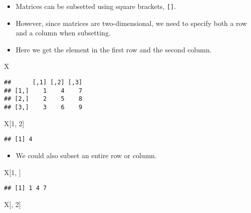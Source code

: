 \documentclass[]{book}
\newenvironment{Shaded}{\begin{snugshade}}{\end{snugshade}}
\newcommand{\DecValTok}[1]{\textcolor[rgb]{0.00,0.00,0.81}{#1}}
\newcommand{\NormalTok}[1]{#1}
\providecommand{\tightlist}{%
  \setlength{\itemsep}{0pt}\setlength{\parskip}{0pt}}
\begin{document}
\begin{itemize}
\tightlist
\item
  Matrices can be subsetted using square brackets, \texttt{{[}{]}}.
\item
  However, since matrices are two-dimensional, we need to specify both a row and a column when subsetting.
\item
  Here we get the element in the first row and the second column.
\end{itemize}

\begin{Shaded}
\begin{Highlighting}[]
\NormalTok{X}
\end{Highlighting}
\end{Shaded}

\begin{verbatim}
##      [,1] [,2] [,3]
## [1,]    1    4    7
## [2,]    2    5    8
## [3,]    3    6    9
\end{verbatim}

\begin{Shaded}
\begin{Highlighting}[]
\NormalTok{X[}\DecValTok{1}\NormalTok{, }\DecValTok{2}\NormalTok{]}
\end{Highlighting}
\end{Shaded}

\begin{verbatim}
## [1] 4
\end{verbatim}

\begin{itemize}
\tightlist
\item
  We could also subset an entire row or column.
\end{itemize}

\begin{Shaded}
\begin{Highlighting}[]
\NormalTok{X[}\DecValTok{1}\NormalTok{, ]}
\end{Highlighting}
\end{Shaded}

\begin{verbatim}
## [1] 1 4 7
\end{verbatim}

\begin{Shaded}
\begin{Highlighting}[]
\NormalTok{X[, }\DecValTok{2}\NormalTok{]}
\end{Highlighting}
\end{Shaded}
\end{document}
